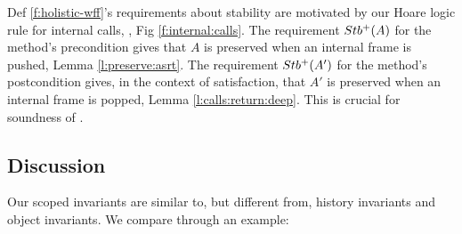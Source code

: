 {Def \ref{f:holistic-wff}'s  requirements about stability are motivated by our Hoare logic rule for internal calls,   {}, Fig \ref{f:internal:calls}. The requirement    ${Stb^+( A )}$ for the method's precondition  gives that $A$ is preserved when an internal frame is pushed, \cf Lemma \ref{l:preserve:asrt}.
The requirement     ${Stb^+( A' )}$ for the method's postcondition gives,  in the context of \strong satisfaction,  that $A'$ is preserved when an internal frame is popped, \cf Lemma \ref{l:calls:return:deep}. This is crucial for soundness of  {}.




\subsection{\textbf{Discussion}}  

  Our scoped invariants are similar to, but different from, history invariants  and object invariants.
We compare through an example:

}
